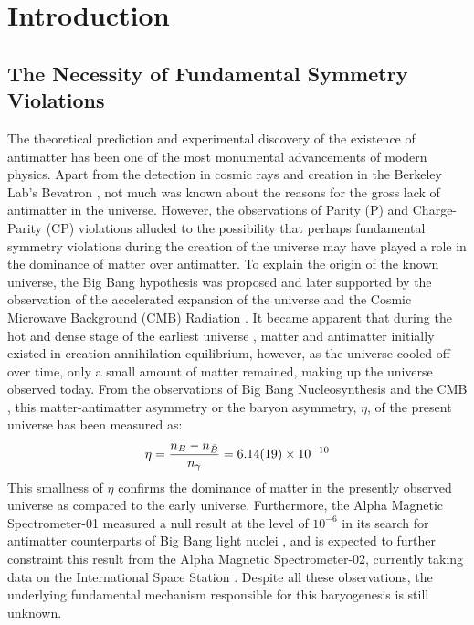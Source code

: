 \chapter{Introduction}\label{ch:intro}

\ifpdf
    \graphicspath{{figures/chapter1-figs/}{Chapter1/Figs/PDF/}{Chapter1/Figs/}}
\else
    \graphicspath{{Chapter1/Figs/Vector/}{Chapter1/Figs/}}
\fi

\section{The Necessity of Fundamental Symmetry Violations}

The theoretical prediction \cite{Dirac1928, Dirac1930, Oppenheimer1930, Dirac1931} and experimental discovery \cite{Anderson1932, Anderson1933} of the existence of antimatter has been one of the most monumental advancements of modern physics. Apart from the detection in cosmic rays \cite{Anderson1932, Anderson1933, Blackett1933} and creation in the Berkeley Lab's Bevatron \cite{Chamberlain1955}, not much was known about the reasons for the gross lack of antimatter in the universe. However, the observations of Parity (P) \cite{Wu1957, Garwin1957} and Charge-Parity (CP) \cite{Christenson1964} violations alluded to the possibility that perhaps fundamental symmetry violations during the creation of the universe may have played a role in the dominance of matter over antimatter. To explain the origin of the known universe, the Big Bang hypothesis was proposed \cite{ Friedman1922, Lemaitre1927, Bartelmann2010} and later supported by the observation of the accelerated expansion of the universe \cite{Hubble1929, Bartelmann2010} and the Cosmic Microwave Background (CMB) Radiation \cite{Penzias1965, Dicke1965, Bartelmann2010}. It became apparent that during the hot and dense stage of the earliest universe \cite{Gamow1946, Alpher1948, Bartelmann2010}, matter and antimatter initially existed in creation-annihilation equilibrium, however, as the universe cooled off over time, only a small amount of matter remained, making up the universe observed today. From the observations of Big Bang Nucleosynthesis and the CMB \cite{Fields2020, PDG2022, Bartelmann2010}, this matter-antimatter asymmetry or the baryon asymmetry, $\eta$, of the present universe has been measured as: 
\begin{equation}
    \eta = \frac{n_B - n_{\Bar{B}}}{n_{\gamma}} = 6.14(19) \times 10^{-10}
\end{equation}
This smallness of $\eta$ confirms the dominance of matter in the presently observed universe as compared to the early universe. Furthermore, the Alpha Magnetic Spectrometer-01 measured a null result at the level of $10^{-6}$ in its search for antimatter counterparts of Big Bang light nuclei \cite{Alcaraz1999}, and is expected to further constraint this result from the Alpha Magnetic Spectrometer-02, currently taking data on the International Space Station \cite{Kounine2012}. Despite all these observations, the underlying fundamental mechanism responsible for this baryogenesis is still unknown.

